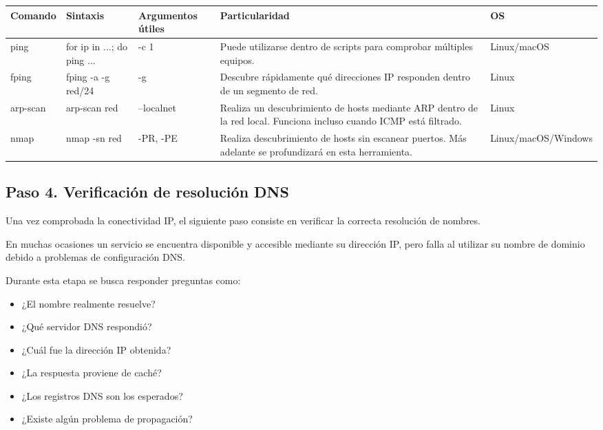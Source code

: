 \documentclass[a4paper,10pt]{article}
\begin{document}
\begin{longtable}{|p{2.8cm}|p{3cm}|p{4cm}|p{5.6cm}|p{1.5cm}|}

\hline
Comando &
Sintaxis &
Argumentos útiles &
Particularidad &
OS
\\
\hline
\endhead

ping &
for ip in ...; do ping ... &
-c 1 &
Puede utilizarse dentro de scripts para comprobar múltiples equipos. &
Linux/macOS
\\
\hline

fping &
fping -a -g red/24 &
-g &
Descubre rápidamente qué direcciones IP responden dentro de un segmento de red. &
Linux
\\
\hline

arp-scan &
arp-scan red &
--localnet &
Realiza un descubrimiento de hosts mediante ARP dentro de la red local. Funciona incluso cuando ICMP está filtrado. &
Linux
\\
\hline

nmap &
nmap -sn red &
-PR, -PE &
Realiza descubrimiento de hosts sin escanear puertos. Más adelante se profundizará en esta herramienta. &
Linux/macOS/Windows
\\
\hline

\end{longtable}




\subsection{Paso 4. Verificación de resolución DNS}

Una vez comprobada la conectividad IP, el siguiente paso consiste en verificar
la correcta resolución de nombres.

En muchas ocasiones un servicio se encuentra disponible y accesible mediante su
dirección IP, pero falla al utilizar su nombre de dominio debido a problemas de
configuración DNS.

Durante esta etapa se busca responder preguntas como:

\begin{itemize}
\item ¿El nombre realmente resuelve?
\item ¿Qué servidor DNS respondió?
\item ¿Cuál fue la dirección IP obtenida?
\item ¿La respuesta proviene de caché?
\item ¿Los registros DNS son los esperados?
\item ¿Existe algún problema de propagación?
\end{itemize}
\end{document}
